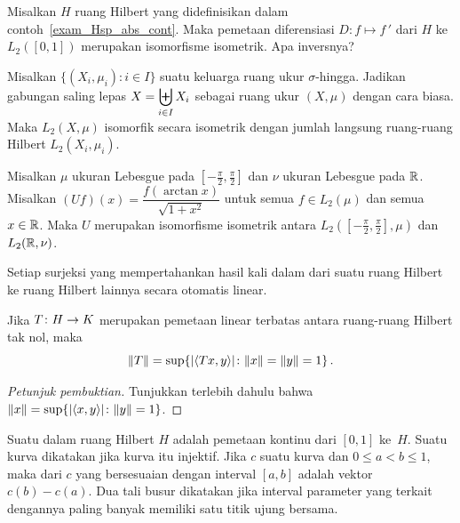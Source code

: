 \begin{exam} Misalkan $H$ ruang Hilbert yang didefinisikan dalam contoh~\ref{exam_Hsp_abs_cont}. Maka pemetaan diferensiasi
$D\colon f \mapsto f\,'$ dari $H$ ke $L_2([0,1])$ merupakan isomorfisme isometrik. Apa inversnya?
\end{exam}

\begin{exam} Misalkan $\{(X_i,\mu_i) \colon i \in I\}$ suatu keluarga ruang ukur $\sigma$-hingga. Jadikan gabungan saling lepas
$\displaystyle X = \biguplus_{i \in I}X_i$ sebagai ruang ukur $(X,\mu)$ dengan cara biasa. Maka $L_2(X,\mu)$ isomorfik secara isometrik
dengan jumlah langsung ruang-ruang Hilbert $L_2(X_i,\mu_i)$.
\end{exam}

\begin{exam} Misalkan $\mu$ ukuran Lebesgue pada $[-\frac\pi2, \frac\pi2]$ dan $\nu$ ukuran Lebesgue pada $\mathbb{R}$.
Misalkan $(Uf)(x) = \dfrac{f(\arctan x)}{\sqrt{1+x^2}}$ untuk semua $f \in L_2(\mu)$ dan semua $x \in \mathbb{R}$. Maka $U$ merupakan
isomorfisme isometrik antara $L_2([-\frac\pi2, \frac\pi2], \mu)$ dan $L_2(\mathbb{R}, \nu)$.
\end{exam}

\begin{prop} Setiap surjeksi yang mempertahankan hasil kali dalam dari suatu ruang Hilbert ke ruang Hilbert lainnya secara otomatis linear.
\end{prop}

\begin{prop}\label{prop_norm_lin_map} Jika $T\colon H \rightarrow K$ merupakan pemetaan linear terbatas antara ruang-ruang Hilbert tak nol, maka
   \[ \lVert T\rVert = \sup\{\lvert\langle Tx,y \rangle\rvert\colon \lVert x\rVert = \lVert y\rVert = 1\}\,. \]
\end{prop}

\begin{proof}[\emph{Petunjuk pembuktian}] Tunjukkan terlebih dahulu bahwa $\lVert x\rVert = \sup\{\lvert\langle x,y \rangle\rvert\colon \lVert y\rVert = 1\}$. \ns
\end{proof}

\begin{defn} Suatu
 dalam ruang Hilbert $H$ adalah pemetaan kontinu dari $[0,1]$ ke~$H$. Suatu kurva dikatakan
 jika kurva itu injektif. Jika $c$ suatu kurva dan $0 \le a < b \le 1$, maka
 dari $c$ yang bersesuaian dengan interval $[a,b]$ adalah vektor $c(b) - c(a)$. Dua tali busur dikatakan
 jika interval parameter yang terkait dengannya paling banyak memiliki satu titik ujung bersama.
\end{defn}

